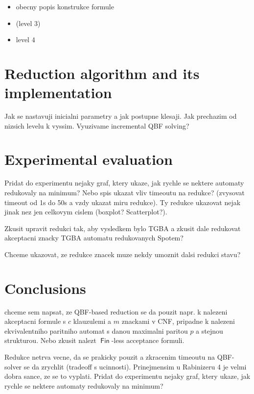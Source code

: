 \documentclass[a4paper,UKenglish,cleveref, autoref, thm-restate]{lipics-v2021}
\DeclareMathOperator{\Fin}{\mathsf{Fin}}
\begin{document}
\begin{itemize}
\item obecny popis konstrukce formule
\item (level 3)
\item level 4
\end{itemize}


\section{Reduction algorithm and its implementation}\label{sec:algimpl}
Jak se nastavuji inicialni parametry a jak postupne klesaji.
Jak prechazim od nizsich levelu k vyssim.
Vyuzivame incremental QBF solving?


\section{Experimental evaluation}\label{sec:experiments}

Pridat do experimentu nejaky graf, ktery ukaze, jak rychle se nektere
automaty redukovaly na minimum? Nebo spis ukazat vliv timeoutu na
redukce?  (zvysovat timeout od 1s do 50s a vzdy ukazat miru
redukce). Ty redukce ukazovat nejak jinak nez jen celkovym cislem
(boxplot? Scatterplot?).

Zkusit upravit redukci tak, aby vysledkem bylo TGBA a zkusit dale
redukovat akceptacni znacky TGBA automatu redukovanych Spotem?

Chceme ukazovat, ze redukce znacek muze nekdy umoznit dalsi redukci stavu?


\section{Conclusions}\label{sec:conclusion}

chceme sem napsat, ze QBF-based reduction se da pouzit napr. k
nalezeni akceptacni formule s $c$ klauzulemi a $m$ znackami v CNF,
pripadne k nalezeni ekvivalentniho paritniho automat s danou maximalni
paritou $p$ a stejnou strukturou. Nebo zkusit nalezt $\Fin$-less
acceptance formuli.

Redukce netrva vecne, da se prakicky pouzit a zkracenim timeoutu na
QBF-solver se da zrychlit (tradeoff s ucinnosti). Prinejmensim u
Rabinizeru 4 je velmi dobra sance, ze se to vyplati. Pridat do
experimentu nejaky graf, ktery ukaze, jak rychle se nektere automaty
redukovaly na minimum?


%

\end{document}
